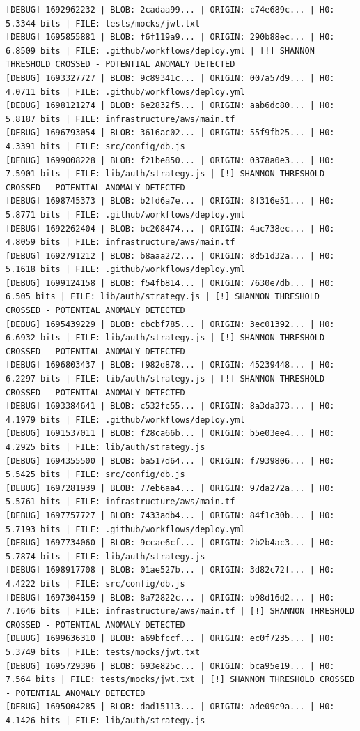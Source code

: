 \documentclass[12pt, a4paper, oneside]{report}
\begin{document}
\begin{lstlisting}[basicstyle=\tiny\ttfamily]
[DEBUG] 1692962232 | BLOB: 2cadaa99... | ORIGIN: c74e689c... | H0: 5.3344 bits | FILE: tests/mocks/jwt.txt
[DEBUG] 1695855881 | BLOB: f6f119a9... | ORIGIN: 290b88ec... | H0: 6.8509 bits | FILE: .github/workflows/deploy.yml | [!] SHANNON THRESHOLD CROSSED - POTENTIAL ANOMALY DETECTED
[DEBUG] 1693327727 | BLOB: 9c89341c... | ORIGIN: 007a57d9... | H0: 4.0711 bits | FILE: .github/workflows/deploy.yml
[DEBUG] 1698121274 | BLOB: 6e2832f5... | ORIGIN: aab6dc80... | H0: 5.8187 bits | FILE: infrastructure/aws/main.tf
[DEBUG] 1696793054 | BLOB: 3616ac02... | ORIGIN: 55f9fb25... | H0: 4.3391 bits | FILE: src/config/db.js
[DEBUG] 1699008228 | BLOB: f21be850... | ORIGIN: 0378a0e3... | H0: 7.5901 bits | FILE: lib/auth/strategy.js | [!] SHANNON THRESHOLD CROSSED - POTENTIAL ANOMALY DETECTED
[DEBUG] 1698745373 | BLOB: b2fd6a7e... | ORIGIN: 8f316e51... | H0: 5.8771 bits | FILE: .github/workflows/deploy.yml
[DEBUG] 1692262404 | BLOB: bc208474... | ORIGIN: 4ac738ec... | H0: 4.8059 bits | FILE: infrastructure/aws/main.tf
[DEBUG] 1692791212 | BLOB: b8aaa272... | ORIGIN: 8d51d32a... | H0: 5.1618 bits | FILE: .github/workflows/deploy.yml
[DEBUG] 1699124158 | BLOB: f54fb814... | ORIGIN: 7630e7db... | H0: 6.505 bits | FILE: lib/auth/strategy.js | [!] SHANNON THRESHOLD CROSSED - POTENTIAL ANOMALY DETECTED
[DEBUG] 1695439229 | BLOB: cbcbf785... | ORIGIN: 3ec01392... | H0: 6.6932 bits | FILE: lib/auth/strategy.js | [!] SHANNON THRESHOLD CROSSED - POTENTIAL ANOMALY DETECTED
[DEBUG] 1696803437 | BLOB: f982d878... | ORIGIN: 45239448... | H0: 6.2297 bits | FILE: lib/auth/strategy.js | [!] SHANNON THRESHOLD CROSSED - POTENTIAL ANOMALY DETECTED
[DEBUG] 1693384641 | BLOB: c532fc55... | ORIGIN: 8a3da373... | H0: 4.1979 bits | FILE: .github/workflows/deploy.yml
[DEBUG] 1691537011 | BLOB: f28ca66b... | ORIGIN: b5e03ee4... | H0: 4.2925 bits | FILE: lib/auth/strategy.js
[DEBUG] 1694355500 | BLOB: ba517d64... | ORIGIN: f7939806... | H0: 5.5425 bits | FILE: src/config/db.js
[DEBUG] 1697281939 | BLOB: 77eb6aa4... | ORIGIN: 97da272a... | H0: 5.5761 bits | FILE: infrastructure/aws/main.tf
[DEBUG] 1697757727 | BLOB: 7433adb4... | ORIGIN: 84f1c30b... | H0: 5.7193 bits | FILE: .github/workflows/deploy.yml
[DEBUG] 1697734060 | BLOB: 9ccae6cf... | ORIGIN: 2b2b4ac3... | H0: 5.7874 bits | FILE: lib/auth/strategy.js
[DEBUG] 1698917708 | BLOB: 01ae527b... | ORIGIN: 3d82c72f... | H0: 4.4222 bits | FILE: src/config/db.js
[DEBUG] 1697304159 | BLOB: 8a72822c... | ORIGIN: b98d16d2... | H0: 7.1646 bits | FILE: infrastructure/aws/main.tf | [!] SHANNON THRESHOLD CROSSED - POTENTIAL ANOMALY DETECTED
[DEBUG] 1699636310 | BLOB: a69bfccf... | ORIGIN: ec0f7235... | H0: 5.3749 bits | FILE: tests/mocks/jwt.txt
[DEBUG] 1695729396 | BLOB: 693e825c... | ORIGIN: bca95e19... | H0: 7.564 bits | FILE: tests/mocks/jwt.txt | [!] SHANNON THRESHOLD CROSSED - POTENTIAL ANOMALY DETECTED
[DEBUG] 1695004285 | BLOB: dad15113... | ORIGIN: ade09c9a... | H0: 4.1426 bits | FILE: lib/auth/strategy.js
\end{lstlisting}
\end{document}

